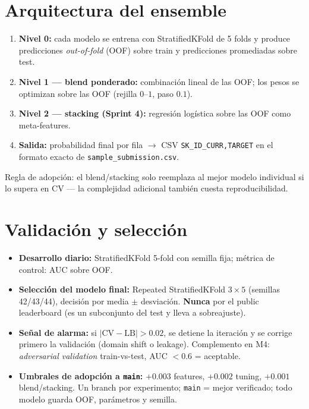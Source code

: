 \documentclass[11pt,a4paper]{article}
\begin{document}
\section{Arquitectura del ensemble}
\begin{enumerate}
  \item \textbf{Nivel 0:} cada modelo se entrena con StratifiedKFold de 5 folds
        y produce predicciones \emph{out-of-fold} (OOF) sobre train y
        predicciones promediadas sobre test.
  \item \textbf{Nivel 1 --- blend ponderado:} combinaci\'on lineal de las OOF;
        los pesos se optimizan sobre las OOF (rejilla $0$--$1$, paso $0.1$).
  \item \textbf{Nivel 2 --- stacking (Sprint 4):} regresi\'on log\'istica sobre
        las OOF como meta-features.
  \item \textbf{Salida:} probabilidad final por fila $\rightarrow$ CSV
        \texttt{SK\_ID\_CURR,TARGET} en el formato exacto de
        \texttt{sample\_submission.csv}.
\end{enumerate}
Regla de adopci\'on: el blend/stacking solo reemplaza al mejor modelo individual
si lo supera en CV --- la complejidad adicional tambi\'en cuesta
reproducibilidad.

\section{Validaci\'on y selecci\'on}
\begin{itemize}
  \item \textbf{Desarrollo diario:} StratifiedKFold 5-fold con semilla fija;
        m\'etrica de control: AUC sobre OOF.
  \item \textbf{Selecci\'on del modelo final:} Repeated StratifiedKFold $3
        \times 5$ (semillas 42/43/44), decisi\'on por media $\pm$ desviaci\'on.
        \textbf{Nunca} por el public leaderboard (es un subconjunto del test y
        lleva a sobreajuste).
  \item \textbf{Se\~nal de alarma:} si $|\text{CV} - \text{LB}| > 0.02$, se
        detiene la iteraci\'on y se corrige primero la validaci\'on (domain
        shift o leakage). Complemento en M4: \emph{adversarial validation}
        train-vs-test, AUC $< 0.6$ = aceptable.
  \item \textbf{Umbrales de adopci\'on a \texttt{main}:} $+0.003$ features,
        $+0.002$ tuning, $+0.001$ blend/stacking. Un branch por experimento;
        \texttt{main} = mejor verificado; todo modelo guarda OOF, par\'ametros
        y semilla.
\end{itemize}
\end{document}
